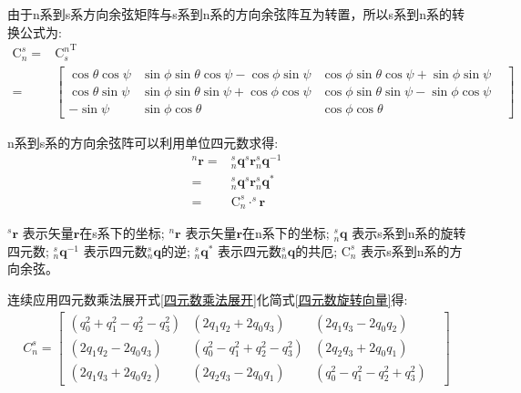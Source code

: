 由于n系到s系方向余弦矩阵与s系到n系的方向余弦阵互为转置\citep{方向余弦阵}，所以s系到n系的转换公式为:
\begin{equation}\label{欧拉角s转n}
    \begin{split} 
        \mathrm{C}^s_n=&{\mathrm{C}^n_s}^\mathrm{T} \\
             =&\left[\begin{matrix}
                \cos{\theta}\cos{\psi} & \sin{\phi}\sin{\theta}\cos{\psi}-\cos{\phi}\sin{\psi} & \cos{\phi}\sin{\theta}\cos{\psi}+\sin{\phi}\sin{\psi} & \\
                \cos{\theta}\sin{\psi} & \sin{\phi}\sin{\theta}\sin{\psi}+\cos{\phi}\cos{\psi} & \cos{\phi}\sin{\theta}\sin{\psi}-\sin{\phi}\cos{\psi} & \\
                -\sin{\psi} & \sin{\phi}\cos{\theta} & \cos{\phi}\cos{\theta} &
                \end{matrix}\right]
    \end{split}
\end{equation} 

n系到s系的方向余弦阵可以利用单位四元数\citep{四元数矢量旋转证明1,四元数矢量旋转证明2}求得:
\begin{equation}\label{四元数旋转向量}
    \begin{split} 
        ^n\bm{r} 
        = &^s_n\bm{q} ^s\bm{r} ^s_n\bm{q}^{-1} \\
        = &^s_n\bm{q} ^s\bm{r} ^s_n\bm{q}^{*} \\
        = &\mathrm{C}^s_n \cdot ^s\bm{r}
    \end{split}
\end{equation} 

$^s\bm{r}$          表示矢量$\bm{r}$在s系下的坐标;
$^n\bm{r}$          表示矢量$\bm{r}$在n系下的坐标;
$^s_n\bm{q}$        表示s系到n系的旋转四元数;
$^s_n\bm{q}^{-1}$   表示四元数$^s_n\bm{q}$的逆\citep{四元数矢量旋转证明1,四元数矢量旋转证明2};
$^s_n\bm{q}^{*}$    表示四元数$^s_n\bm{q}$的共厄\citep{四元数矢量旋转证明1,四元数矢量旋转证明2};
$\mathrm{C}^s_n$    表示s系到n系的方向余弦。

连续应用四元数乘法展开式\ref{四元数乘法展开}化简式\ref{四元数旋转向量}得:
\begin{equation}\label{四元数方向余弦阵}
    \begin{split} 
        C^s_n = \left[\begin{matrix} 
                (q^2_0+q^2_1-q^2_2-q^2_3) & (2q_1q_2+2q_0q_3) & (2q_1q_3-2q_0q_2) & \\
                (2q_1q_2-2q_0q_3) & (q^2_0-q^2_1+q^2_2-q^2_3) & (2q_2q_3+2q_0q_1) & \\
                (2q_1q_3+2q_0q_2) & (2q_2q_3-2q_0q_1) & (q^2_0-q^2_1-q^2_2+q^2_3) &
        \end{matrix}\right]
    \end{split}
\end{equation} 

